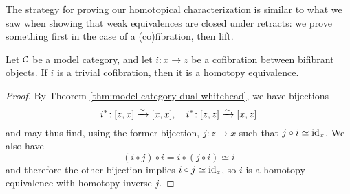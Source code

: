 The strategy for proving our homotopical characterization is similar to what we saw when showing that weak equivalences are closed under retracts:
we prove something first in the case of a (co)fibration, then lift.
\begin{lemma}\label{lemma:model-category-cofibration-between-fibrant-objects-trivial-implies-homotopy-equivalence}
	Let \(\mathcal{C}\) be a model category, and let \(i\!:x\to z\) be a cofibration between bifibrant objects. If \(i\) is a trivial cofibration, then it is a homotopy equivalence.
\end{lemma}
\begin{proof}
By Theorem \ref{thm:model-category-dual-whitehead}, we have bijections
\[ i^*\!:[z,x] \xrightarrow{\sim} [x,x],\quad i^*\!:[z,z] \xrightarrow{\sim} [x,z] \]
and may thus find, using the former bijection, \(j\!:z\to x\) such that \(j\circ i \simeq \mathrm{id}_x\). We also have
\[ (i\circ j)\circ i = i \circ (j\circ i)\simeq i \]
and therefore the other bijection implies \(i\circ j \simeq \mathrm{id}_z\), so \(i\) is a homotopy equivalence with homotopy inverse \(j\).
\end{proof}

